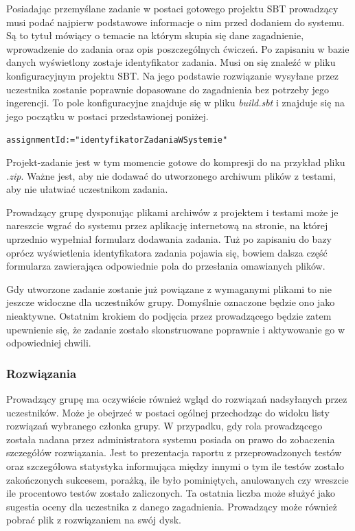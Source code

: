 \documentclass[brudnopis]{xmgr}
\begin{document}
Posiadając przemyślane zadanie w postaci gotowego projektu SBT prowadzący musi podać najpierw podstawowe informacje o nim przed dodaniem do systemu. Są to tytuł mówiący o temacie na którym skupia się dane zagadnienie, wprowadzenie do zadania oraz opis poszczególnych ćwiczeń. Po zapisaniu w bazie danych wyświetlony zostaje identyfikator zadania. Musi on się znaleźć w pliku konfiguracyjnym projektu SBT. Na jego podstawie rozwiązanie wysyłane przez uczestnika zostanie poprawnie dopasowane do zagadnienia bez potrzeby jego ingerencji. To pole konfiguracyjne znajduje się w pliku \emph{build.sbt} i znajduje się na jego początku w postaci przedstawionej poniżej.

\begin{alltt}
assignmentId := "identyfikatorZadaniaWSystemie"
\end{alltt}

Projekt-zadanie jest w tym momencie gotowe do kompresji do na przykład pliku \emph{.zip}. Ważne jest, aby nie dodawać do utworzonego archiwum plików z testami, aby nie ułatwiać uczestnikom zadania. 

Prowadzący grupę dysponując plikami archiwów z projektem i testami może je nareszcie wgrać do systemu przez aplikację internetową na stronie, na której uprzednio wypełniał formularz dodawania zadania. Tuż po zapisaniu do bazy oprócz wyświetlenia identyfikatora zadania pojawia się, bowiem dalsza część formularza zawierająca odpowiednie pola do przesłania omawianych plików.

Gdy utworzone zadanie zostanie już powiązane z wymaganymi plikami to nie jeszcze widoczne dla uczestników grupy. Domyślnie oznaczone będzie ono jako nieaktywne. Ostatnim krokiem do podjęcia przez prowadzącego będzie zatem upewnienie się, że zadanie zostało skonstruowane poprawnie i aktywowanie go w odpowiedniej chwili.

\subsubsection{Rozwiązania}

Prowadzący grupę ma oczywiście również wgląd do rozwiązań nadsyłanych przez uczestników. Może je obejrzeć w postaci ogólnej przechodząc do widoku listy rozwiązań wybranego członka grupy. W przypadku, gdy rola prowadzącego została nadana przez administratora systemu posiada on prawo do zobaczenia szczegółów rozwiązania. Jest to prezentacja raportu z przeprowadzonych testów oraz szczegółowa statystyka informująca między innymi o tym ile testów zostało zakończonych sukcesem, porażką, ile było pominiętych, anulowanych czy wreszcie ile procentowo testów zostało zaliczonych. Ta ostatnia liczba może służyć jako sugestia oceny dla uczestnika z danego zagadnienia. Prowadzący może również pobrać plik z rozwiązaniem na swój dysk.
\end{document}
